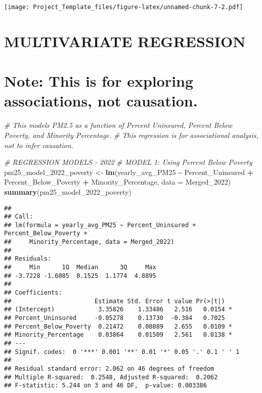 \documentclass[
]{article}
\newenvironment{Shaded}{\begin{snugshade}}{\end{snugshade}}
\newcommand{\AttributeTok}[1]{\textcolor[rgb]{0.13,0.29,0.53}{#1}}
\newcommand{\CommentTok}[1]{\textcolor[rgb]{0.56,0.35,0.01}{\textit{#1}}}
\newcommand{\FunctionTok}[1]{\textcolor[rgb]{0.13,0.29,0.53}{\textbf{#1}}}
\newcommand{\NormalTok}[1]{#1}
\newcommand{\OtherTok}[1]{\textcolor[rgb]{0.56,0.35,0.01}{#1}}
\newcommand{\SpecialCharTok}[1]{\textcolor[rgb]{0.81,0.36,0.00}{\textbf{#1}}}
\begin{document}
\texttt{[image: Project\_Template\_files/figure-latex/unnamed-chunk-7-2.pdf]}

\section{MULTIVARIATE REGRESSION}\label{multivariate-regression}

\section{Note: This is for exploring associations, not
causation.}\label{note-this-is-for-exploring-associations-not-causation.}

\begin{Shaded}
\begin{Highlighting}[]
\CommentTok{\# This models PM2.5 as a function of Percent Uninsured, Percent Below Poverty, and Minority Percentage.}
\CommentTok{\# This regression is for associational analysis, not to infer causation.}

\CommentTok{\# REGRESSION MODELS {-} 2022}
\CommentTok{\# MODEL 1: Using Percent Below Poverty}
\NormalTok{pm25\_model\_2022\_poverty }\OtherTok{\textless{}{-}} \FunctionTok{lm}\NormalTok{(yearly\_avg\_PM25 }\SpecialCharTok{\textasciitilde{}}\NormalTok{ Percent\_Uninsured }\SpecialCharTok{+}\NormalTok{ Percent\_Below\_Poverty }\SpecialCharTok{+}\NormalTok{ Minority\_Percentage, }\AttributeTok{data =}\NormalTok{ Merged\_2022)}
\FunctionTok{summary}\NormalTok{(pm25\_model\_2022\_poverty)}
\end{Highlighting}
\end{Shaded}

\begin{verbatim}
## 
## Call:
## lm(formula = yearly_avg_PM25 ~ Percent_Uninsured + Percent_Below_Poverty + 
##     Minority_Percentage, data = Merged_2022)
## 
## Residuals:
##     Min      1Q  Median      3Q     Max 
## -3.7228 -1.6085  0.1525  1.1774  4.8895 
## 
## Coefficients:
##                       Estimate Std. Error t value Pr(>|t|)  
## (Intercept)            3.35826    1.33486   2.516   0.0154 *
## Percent_Uninsured     -0.05278    0.13730  -0.384   0.7025  
## Percent_Below_Poverty  0.21472    0.08089   2.655   0.0109 *
## Minority_Percentage    0.03864    0.01509   2.561   0.0138 *
## ---
## Signif. codes:  0 '***' 0.001 '**' 0.01 '*' 0.05 '.' 0.1 ' ' 1
## 
## Residual standard error: 2.062 on 46 degrees of freedom
## Multiple R-squared:  0.2548, Adjusted R-squared:  0.2062 
## F-statistic: 5.244 on 3 and 46 DF,  p-value: 0.003386
\end{verbatim}
\end{document}
